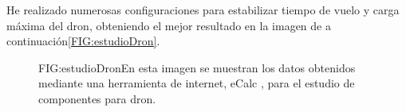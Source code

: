 
He realizado numerosas configuraciones para estabilizar tiempo de vuelo y carga máxima del dron, obteniendo el mejor resultado en la imagen de a continuación\ref{FIG:estudioDron}.
\begin{figure}[Estudio técnico de dron]{FIG:estudioDron}{En esta imagen se muestran los datos obtenidos mediante una herramienta de internet, eCalc \cite{DroneConfig}, para el estudio de componentes para dron.}
\end{figure}